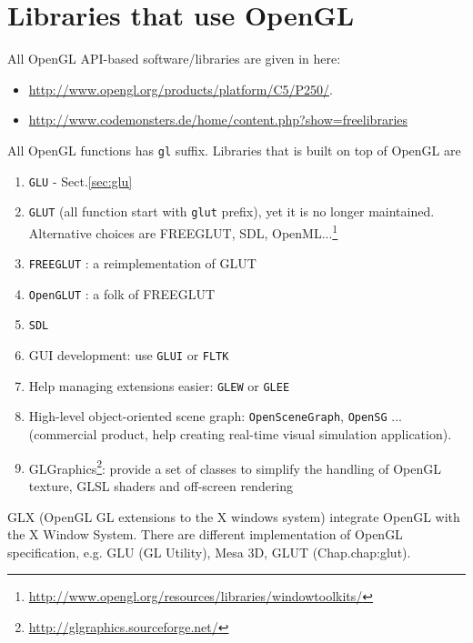 \section{Libraries that use OpenGL}

All OpenGL API-based software/libraries are given in here:
\begin{itemize}
\item \url{http://www.opengl.org/products/platform/C5/P250/}. 
\item  \url{http://www.codemonsters.de/home/content.php?show=freelibraries}

\end{itemize}

All OpenGL functions has \verb!gl!  suffix. Libraries that is built on
top of OpenGL are
\begin{enumerate}
\item \verb!GLU! - Sect.\ref{sec:glu}
 
\item \verb!GLUT! (all function start with \verb!glut! prefix), yet it
  is no longer maintained. Alternative choices are FREEGLUT, SDL,
  OpenML...\footnote{\url{http://www.opengl.org/resources/libraries/windowtoolkits/}}
   
\item \verb!FREEGLUT! : a reimplementation of GLUT

\item \verb!OpenGLUT! : a folk of FREEGLUT

\item \verb!SDL!

\item GUI development: use \verb!GLUI! or \verb!FLTK!

\item Help managing extensions easier: \verb!GLEW! or \verb!GLEE!

\item High-level object-oriented scene graph: \verb!OpenSceneGraph!,
  \verb!OpenSG! ...(commercial product, help creating real-time
  visual simulation application). 
 
\item GLGraphics\footnote{\url{http://glgraphics.sourceforge.net/}}:
  provide a set of classes to simplify the handling of OpenGL texture,
  GLSL shaders and off-screen rendering
\end{enumerate}

GLX (OpenGL GL extensions to the X windows system) integrate
OpenGL with the X Window System. There are different implementation of OpenGL
specification, e.g. GLU (GL Utility), Mesa 3D, GLUT (Chap.{chap:glut}).


